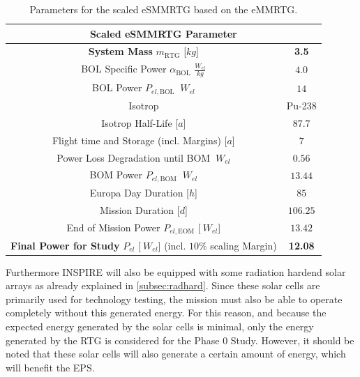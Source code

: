 \begin{table}[H]
\centering
\begin{tabular}{|c|c|}
\hline
\multicolumn{2}{|c|}{Scaled eSMMRTG Parameter}                \\ \hline
\textbf{System Mass} $m_\text{RTG}$ [$kg$]                             & \textbf{3.5}     \\ \hline
BOL Specific Power $\alpha_\text{BOL}$ $\frac{W_{el}}{kg}$  & $4.0$     \\ \hline
BOL Power $P_{el,\text{BOL}}$ $\ W_{el}$                    & $14$       \\ \hline
Isotrop                                                     & Pu-238   \\ \hline
Isotrop Half-Life [$a$]                                       & $87.7$     \\ \hline
Flight time and Storage (incl. Margins) [$a$]                 & $7$        \\ \hline
Power Loss Degradation until BOM $\ W_{el}$                 & $0.56$     \\ \hline
BOM Power $P_{el,\text{BOM}}$ $\ W_{el}$                    & $13.44$    \\ \hline
Europa Day Duration [$h$]                                     & $85$       \\ \hline
Mission Duration [$d$]                                        & $106.25$   \\ \hline
End of Mission Power $P_{el,\text{EOM}}$ [$\ W_{el}$]         & $13.42$   \\ \hline
\textbf{Final Power for Study} $P_{el}$ [$\ W_{el}$] (incl. $10\%$ scaling Margin) & \textbf{12.08}    \\ \hline

\end{tabular}
\caption{Parameters for the scaled eSMMRTG based on the eMMRTG.}
\label{tab:esmmrtg}
\end{table}

Furthermore INSPIRE will also be equipped with some radiation hardend solar arrays as already explained in \autoref{subsec:radhard}. Since these solar cells are primarily used for technology testing, the mission must also be able to operate completely without this generated energy. For this reason, and because the expected energy generated by the solar cells is minimal, only the energy generated by the RTG is considered for the Phase 0 Study. However, it should be noted that these solar cells will also generate a certain amount of energy, which will benefit the EPS.


